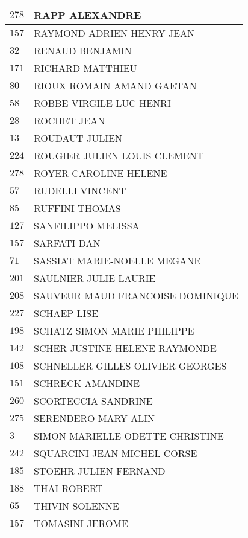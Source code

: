 \begin{xltabular}{\linewidth}{|l|X|}
    $278$ & RAPP ALEXANDRE \\
    \hline
    $157$ & RAYMOND ADRIEN HENRY JEAN \\
    \hline
    $32$ & RENAUD BENJAMIN \\
    \hline
    $171$ & RICHARD MATTHIEU \\
    \hline
    $80$ & RIOUX ROMAIN AMAND GAETAN \\
    \hline
    $58$ & ROBBE VIRGILE LUC HENRI \\
    \hline
    $28$ & ROCHET JEAN \\
    \hline
    $13$ & ROUDAUT JULIEN \\
    \hline
    $224$ & ROUGIER JULIEN LOUIS CLEMENT \\
    \hline
    $278$ & ROYER CAROLINE HELENE \\
    \hline
    $57$ & RUDELLI VINCENT \\
    \hline
    $85$ & RUFFINI THOMAS \\
    \hline
    $127$ & SANFILIPPO MELISSA \\
    \hline
    $157$ & SARFATI DAN \\
    \hline
    $71$ & SASSIAT MARIE-NOELLE MEGANE \\
    \hline
    $201$ & SAULNIER JULIE LAURIE \\
    \hline
    $208$ & SAUVEUR MAUD FRANCOISE DOMINIQUE \\
    \hline
    $227$ & SCHAEP LISE \\
    \hline
    $198$ & SCHATZ SIMON MARIE PHILIPPE \\
    \hline
    $142$ & SCHER JUSTINE HELENE RAYMONDE \\
    \hline
    $108$ & SCHNELLER GILLES OLIVIER GEORGES \\
    \hline
    $151$ & SCHRECK AMANDINE \\
    \hline
    $260$ & SCORTECCIA SANDRINE \\
    \hline
    $275$ & SERENDERO MARY ALIN \\
    \hline
    $3$ & SIMON MARIELLE ODETTE CHRISTINE \\
    \hline
    $242$ & SQUARCINI JEAN-MICHEL CORSE \\
    \hline
    $185$ & STOEHR JULIEN FERNAND \\
    \hline
    $188$ & THAI ROBERT \\
    \hline
    $65$ & THIVIN SOLENNE \\
    \hline
    $157$ & TOMASINI JEROME \\
    \hline

\end{xltabular}
